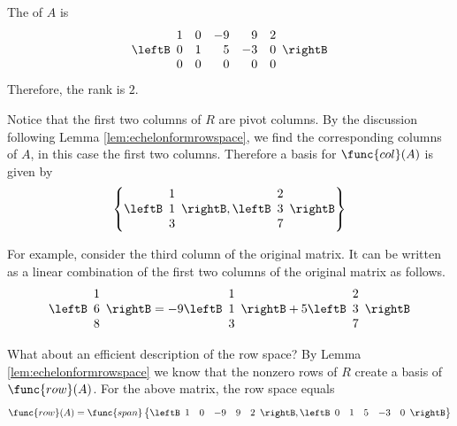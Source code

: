 \begin{solution}
The \rref \;of $A$ is 
\begin{equation*}
\leftB 
\begin{array}{rrrrr}
1 & 0 & -9 & 9 & 2 \\ 
0 & 1 & 5 & -3 & 0 \\ 
0 & 0 & 0 & 0 & 0
\end{array}
\rightB 
\end{equation*}
Therefore, the rank is $2$.

Notice that the first two columns of $R$ are pivot columns. By the discussion following Lemma \ref{lem:echelonformrowspace}, we find the corresponding columns of $A$, in this case the first two columns. Therefore a basis for $\func{col}(A)$ is given by
\[
\left\{\leftB 
\begin{array}{r}
1 \\ 
1 \\ 
3
\end{array}
\rightB , \leftB 
\begin{array}{r}
2 \\ 
3 \\ 
7
\end{array}
\rightB
\right\}
\] 

 For
example, consider the third column of the original matrix. It can be written as a linear combination of the first two columns of the original matrix as follows.
\begin{equation*}
\leftB 
\begin{array}{r}
1 \\ 
6 \\ 
8
\end{array}
\rightB =-9\leftB 
\begin{array}{r}
1 \\ 
1 \\ 
3
\end{array}
\rightB +5\leftB 
\begin{array}{r}
2 \\ 
3 \\ 
7
\end{array}
\rightB 
\end{equation*}

What about an efficient description of the row space? By Lemma \ref{lem:echelonformrowspace} we know that the nonzero rows of $R$ create a basis of $\func{row}(A)$.  For the above matrix, the row space equals 
\[
\func{row}(A) = 
\func{span} \left\{
\leftB 
\begin{array}{rrrrr}
1 & 0 & -9 & 9 & 2
\end{array}
\rightB, \leftB 
\begin{array}{rrrrr}
0 & 1 & 5 & -3 & 0
\end{array}
\rightB
\right\}
\]
\end{solution}

